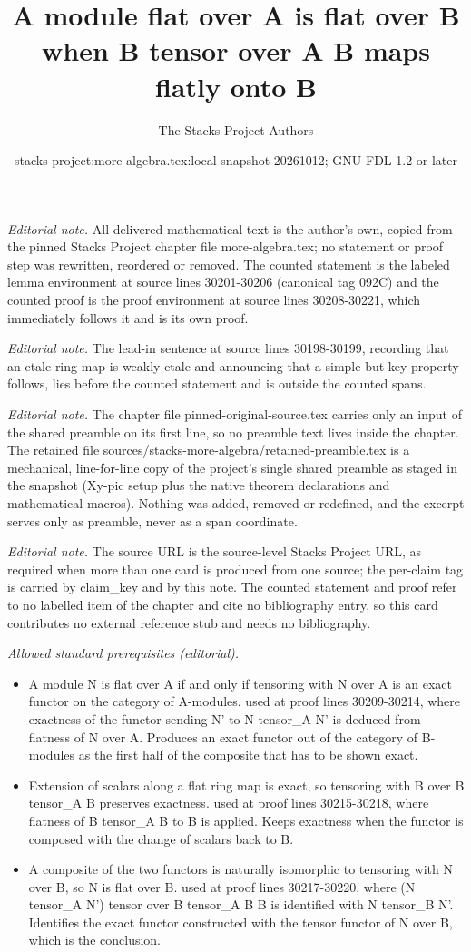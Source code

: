 \documentclass[10pt,a4paper]{amsart}
\title{A module flat over A is flat over B when B tensor over A B maps flatly onto B}
\author{The Stacks Project Authors}
\date{stacks-project:more-algebra.tex:local-snapshot-20261012; GNU FDL 1.2 or later}
\theoremstyle{plain}
\theoremstyle{definition}
\theoremstyle{remark}
\numberwithin{equation}{subsection}
\begin{document}
\maketitle
\setcounter{subsection}{1}
\noindent\textit{Editorial note.} All delivered mathematical text is the author's own, copied from the pinned Stacks Project chapter file more-algebra.tex; no statement or proof step was rewritten, reordered or removed. The counted statement is the labeled lemma environment at source lines 30201-30206 (canonical tag 092C) and the counted proof is the proof environment at source lines 30208-30221, which immediately follows it and is its own proof.\par\medskip
\noindent\textit{Editorial note.} The lead-in sentence at source lines 30198-30199, recording that an etale ring map is weakly etale and announcing that a simple but key property follows, lies before the counted statement and is outside the counted spans.\par\medskip
\noindent\textit{Editorial note.} The chapter file pinned-original-source.tex carries only an input of the shared preamble on its first line, so no preamble text lives inside the chapter. The retained file sources/stacks-more-algebra/retained-preamble.tex is a mechanical, line-for-line copy of the project's single shared preamble as staged in the snapshot (Xy-pic setup plus the native theorem declarations and mathematical macros). Nothing was added, removed or redefined, and the excerpt serves only as preamble, never as a span coordinate.\par\medskip
\noindent\textit{Editorial note.} The source URL is the source-level Stacks Project URL, as required when more than one card is produced from one source; the per-claim tag is carried by claim\_key and by this note. The counted statement and proof refer to no labelled item of the chapter and cite no bibliography entry, so this card contributes no external reference stub and needs no bibliography.\par\medskip
\noindent\textit{Allowed standard prerequisites (editorial).}\begin{itemize}
\item A module N is flat over A if and only if tensoring with N over A is an exact functor on the category of A-modules. used at proof lines 30209-30214, where exactness of the functor sending N' to N tensor\_A N' is deduced from flatness of N over A. Produces an exact functor out of the category of B-modules as the first half of the composite that has to be shown exact.
\item Extension of scalars along a flat ring map is exact, so tensoring with B over B tensor\_A B preserves exactness. used at proof lines 30215-30218, where flatness of B tensor\_A B to B is applied. Keeps exactness when the functor is composed with the change of scalars back to B.
\item A composite of the two functors is naturally isomorphic to tensoring with N over B, so N is flat over B. used at proof lines 30217-30220, where (N tensor\_A N') tensor over B tensor\_A B B is identified with N tensor\_B N'. Identifies the exact functor constructed with the tensor functor of N over B, which is the conclusion.
\end{itemize}\medskip
\end{document}
